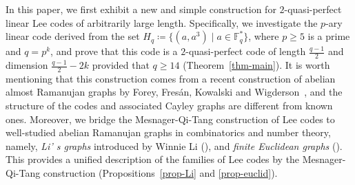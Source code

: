 \documentclass{amsart}
\numberwithin{equation}{section}
\begin{document}

In this paper, we first exhibit a new and simple construction for $2$-quasi-perfect linear Lee codes of arbitrarily large length.
Specifically, we investigate the $p$-ary linear code derived from the set $H_q \coloneq \{(a, a^3) \mid a \in \mathbb{F}_q^*\}$, where $p\geq 5$ is a prime and $q=p^k$, and prove that this code is a $2$-quasi-perfect code of length $\frac{q-1}{2}$ and dimension $\frac{q-1}{2}-2k$ provided that $q \geq 14$ (Theorem~\ref{thm-main}).
It is worth mentioning that this construction comes from a recent construction of abelian almost Ramanujan graphs by Forey, Fres\'{a}n, Kowalski and Wigderson~\cite{FFKW2025}, and the structure of the codes and associated Cayley graphs are different from known ones.
Moreover, we bridge the Mesnager-Qi-Tang construction of Lee codes to well-studied abelian Ramanujan graphs in combinatorics and number theory, namely,  {\it Li' s graphs} introduced by Winnie Li (\cite{LK1992}), and {\it finite Euclidean graphs} (\cite{MMST1996}). 
This provides a unified description of the families of Lee codes by the Mesnager-Qi-Tang construction (Propositions~\ref{prop-Li} and \ref{prop-euclid}).  

\end{document}
